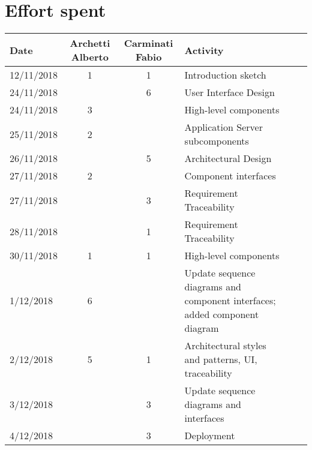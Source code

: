 \documentclass[../DD0.tex]{subfiles}
\newcommand{\addHours}[4]{#1 & #2 & #3 & #4 \\\hline}
\begin{document}
\section*{Effort spent}
\label{sec:effort}
  \begin{table}[h!]
  \centering
  \begin{tabularx}{\linewidth}{|l|c|c|X|Xl}
    \hline
    \textbf{Date}  & \textbf{Archetti Alberto} & \textbf{Carminati Fabio} & \textbf{Activity} \\ \hline
    \addHours{12/11/2018}{1}{1}{Introduction sketch}
    \addHours{24/11/2018}{}{6}{User Interface Design}
    \addHours{24/11/2018}{3}{}{High-level components}
    \addHours{25/11/2018}{2}{}{Application Server subcomponents}
    \addHours{26/11/2018}{}{5}{Architectural Design}
    \addHours{27/11/2018}{2}{}{Component interfaces}
    \addHours{27/11/2018}{}{3}{Requirement Traceability}
    \addHours{28/11/2018}{}{1}{Requirement Traceability}
    \addHours{30/11/2018}{1}{1}{High-level components}
    \addHours{1/12/2018}{6}{}{Update sequence diagrams and component interfaces; added component diagram}
    \addHours{2/12/2018}{5}{1}{Architectural styles and patterns, UI, traceability}
    \addHours{3/12/2018}{}{3}{Update sequence diagrams and interfaces}
    \addHours{4/12/2018}{}{3}{Deployment}
  \end{tabularx}
\end{table}
\end{document}
